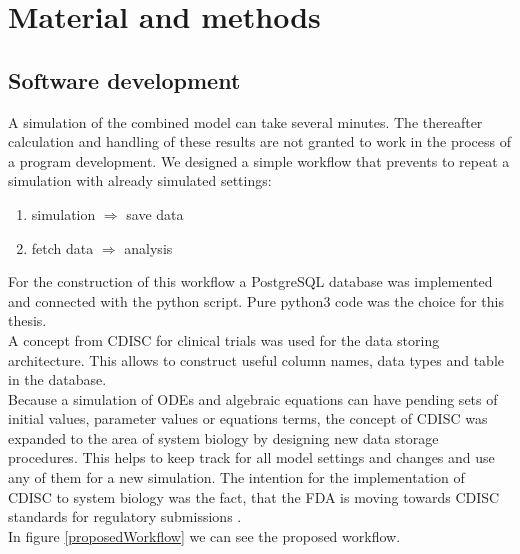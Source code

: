 \section{Material and methods}
\subsection{Software development}
A simulation of the combined model can take several minutes. The thereafter calculation and handling of these results are not granted to work in the process of a program development. We designed a simple workflow that prevents to repeat a simulation with already simulated settings:
\begin{enumerate}
	\item simulation $\Rightarrow$ save data
	\item fetch data $\Rightarrow$ analysis
\end{enumerate}
For the construction of this workflow a PostgreSQL database was implemented and connected with the python script. Pure python3 code was the choice for this thesis.  \\
A concept from CDISC for clinical trials was used for the data storing architecture. This allows to construct useful column names, data types and table in the database.\\ 
Because a simulation of ODEs and algebraic equations can have pending sets of initial values, parameter values or equations terms, the concept of CDISC was expanded to the area of system biology by designing new data storage procedures. This helps to keep track for all model settings and changes and use any of them for a new simulation. The intention for the  implementation of CDISC to system biology was the fact, that the FDA is moving towards CDISC standards for regulatory submissions \cite{SDTMStandard}. \\
In figure \ref{proposedWorkflow} we can see  the proposed workflow.
